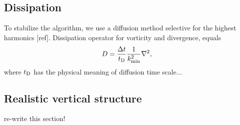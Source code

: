 \documentclass[usenatbib,onecolumn]{mnras}
\newcommand{\alert}[1]{\color{red} #1\color{black}}
\begin{document}
\subsection{Dissipation}

To stabilize the algorithm, we use a diffusion method selective for the
highest harmonics [ref]. Dissipation operator for vorticity and
divergence, equals
\begin{equation}
\displaystyle  D = \frac{\Delta t}{t_{\rm D}} \frac{1}{k_{\rm min}^2}\nabla^2 ,
\end{equation}
where $t_{\rm D}$ has the physical meaning of diffusion time scale...

\subsection{Realistic vertical structure}

\alert{re-write this section!}
\end{document}
